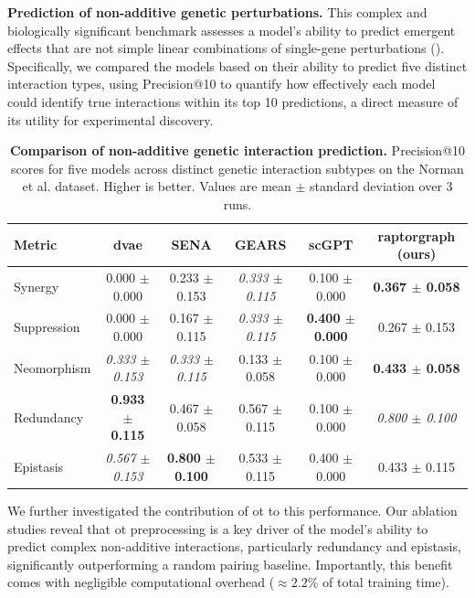 \documentclass[10pt,letterpaper]{article}
\theoremstyle{definition}
\theoremstyle{remark}
\begin{document}
\textbf{Prediction of non-additive genetic perturbations.} This complex and biologically significant benchmark assesses a model's ability to predict emergent effects that are not simple linear combinations of single-gene perturbations ().
Specifically, we compared the models based on their ability to predict five distinct interaction types, using Precision@10 to quantify how effectively each model could identify true interactions within its top 10 predictions, a direct measure of its utility for experimental discovery.

\begin{table}[!ht]
\centering
\caption{\textbf{Comparison of non-additive genetic interaction prediction.} Precision@10 scores for five models across distinct genetic interaction subtypes on the Norman et al. dataset. Higher is better. Values are mean $\pm$ standard deviation over 3 runs.}
\begin{tabular}{lccccc}
\toprule
Metric & \gls{dvae} & SENA & GEARS & scGPT & \gls{raptorgraph} (ours) \\
\midrule
Synergy & 0.000 $\pm$ 0.000 & 0.233 $\pm$ 0.153 & \textit{0.333 $\pm$ 0.115} & 0.100 $\pm$ 0.000 & \textbf{0.367 $\pm$ 0.058} \\
Suppression & 0.000 $\pm$ 0.000 & 0.167 $\pm$ 0.115 & \textit{0.333 $\pm$ 0.115} & \textbf{0.400 $\pm$ 0.000} & 0.267 $\pm$ 0.153 \\
Neomorphism & \textit{0.333 $\pm$ 0.153} & \textit{0.333 $\pm$ 0.115} & 0.133 $\pm$ 0.058 & 0.100 $\pm$ 0.000 & \textbf{0.433 $\pm$ 0.058} \\
Redundancy & \textbf{0.933 $\pm$ 0.115} & 0.467 $\pm$ 0.058 & 0.567 $\pm$ 0.115 & 0.100 $\pm$ 0.000 & \textit{0.800 $\pm$ 0.100} \\
Epistasis & \textit{0.567 $\pm$ 0.153} & \textbf{0.800 $\pm$ 0.100} & 0.533 $\pm$ 0.115 & 0.400 $\pm$ 0.000 & 0.433 $\pm$ 0.115 \\
\bottomrule
\end{tabular}
\label{tab:gi_scores}
\end{table}

We further investigated the contribution of \gls{ot} to this performance. Our ablation studies reveal that \gls{ot} preprocessing is a key driver of the model's ability to predict complex non-additive interactions, particularly redundancy and epistasis, significantly outperforming a random pairing baseline. Importantly, this benefit comes with negligible computational overhead ($\approx 2.2\%$ of total training time).
\end{document}
